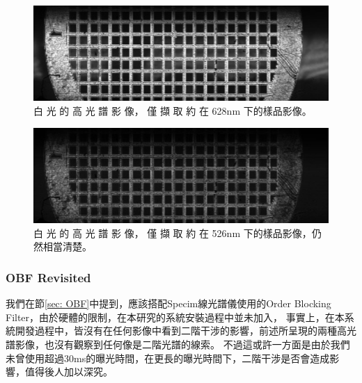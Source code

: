 \documentclass[12pt]{article}
\begin{document}
\begin{figure}
    \centering
    \includegraphics[width = 0.9\linewidth]{1211_10um_10ms-1.jpg}
    \caption{白 光 的 高 光 譜 影 像， 僅 擷 取 約 在
    628nm 下的樣品影像。}
    \label{fig: reflec628}
\end{figure}

\begin{figure}
    \centering
    \includegraphics[width = 0.9\linewidth]{1211_10um_10ms137-1.jpg}
    \caption[白 光 的 高 光 譜 影 像， 僅 擷 取 約 在
    526nm 下的樣品影像]{白 光 的 高 光 譜 影 像， 僅 擷 取 約 在
    526nm 下的樣品影像，仍然相當清楚。}
    \label{fig: reflec526}
\end{figure}

\subsubsection{OBF Revisited}
我們在節\ref{sec: OBF}中提到，應該搭配Specim線光譜儀使用的Order Blocking Filter，由於硬體的限制，在本研究的系統安裝過程中並未加入，
事實上，在本系統開發過程中，皆沒有在任何影像中看到二階干涉的影響，前述所呈現的兩種高光譜影像，也沒有觀察到任何像是二階光譜的線索。
不過這或許一方面是由於我們未曾使用超過30ms的曝光時間，在更長的曝光時間下，二階干涉是否會造成影響，值得後人加以深究。
\end{document}
